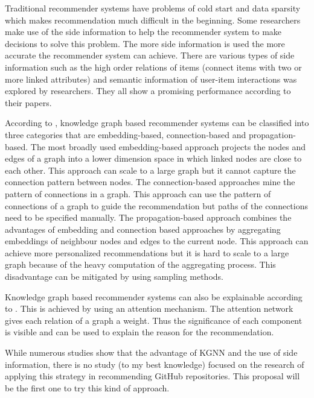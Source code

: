 \documentclass[11pt,twoside]{report}
\begin{document}
Traditional recommender systems have problems of cold start and data sparsity \cite{zhang_knowledge_2020, mansur_review_nodate, wu_graph_2020} which makes recommendation much difficult in the beginning. Some researchers make use of the side information to help the recommender system to make decisions to solve this problem. The more side information is used the more accurate the recommender system can achieve. There are various types of side information such as the high order relations of items (connect items with two or more linked attributes) \cite{wang_kgat_2019} and semantic information of user-item interactions \cite{wang_knowledge_2019} was explored by researchers. They all show a promising performance according to their papers.

According to \cite{guo_survey_2020}, knowledge graph based recommender systems can be classified into three categories that are embedding-based, connection-based and propagation-based. The most broadly used embedding-based approach projects the nodes and edges of a graph into a lower dimension space in which linked nodes are close to each other. This approach can scale to a large graph but it cannot capture the connection pattern between nodes. The connection-based approaches mine the pattern of connections in a graph. This approach can use the pattern of connections of a graph to guide the recommendation but paths of the connections need to be specified manually. The propagation-based approach combines the advantages of embedding and connection based approaches by aggregating embeddings of neighbour nodes and edges to the current node. This approach can achieve more personalized recommendations but it is hard to scale to a large graph because of the heavy computation of the aggregating process. This disadvantage can be mitigated by using sampling methods.

Knowledge graph based recommender systems can also be explainable according to \cite{guo_survey_2020}. This is achieved by using an attention mechanism. The attention network gives each relation of a graph a weight. Thus the significance of each component is visible and can be used to explain the reason for the recommendation.

While numerous studies show that the advantage of KGNN and the use of side information, there is no study (to my best knowledge) focused on the research of applying this strategy in recommending GitHub repositories. This proposal will be the first one to try this kind of approach.

\end{document}
